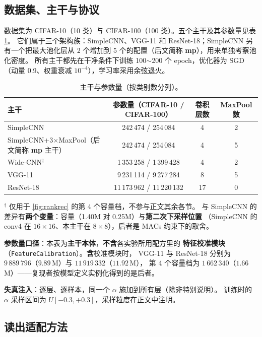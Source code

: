 \documentclass[11pt,a4paper]{ctexart}
\begin{document}
\subsection{数据集、主干与协议}

数据集为 CIFAR-10（10 类）与 CIFAR-100（100 类）。五个主干及其参数量见表 \ref{tab:arch}。
它们属于三个架构族：SimpleCNN、VGG-11 和 ResNet-18；SimpleCNN 另有一个把最大池化层从 2 个增加到 5 个的配置（后文简称 \textbf{mp}），用来单独考察池化密度。
所有主干都先在干净条件下训练 100$\sim$200 个 epoch，优化器为 SGD（动量 0.9、权重衰减 $10^{-4}$），学习率采用余弦退火。

\begin{table}[t]
\centering
\caption{主干与参数量（按类别数分列）。}
\label{tab:arch}
\small
\begin{tabular}{lccc}
\toprule
主干 & 参数量（CIFAR-10 / CIFAR-100） & 卷积层数 & MaxPool 数 \\
\midrule
SimpleCNN & 242\,474 / 254\,084 & 4 & 2 \\
SimpleCNN+3$\times$MaxPool（后文简称 \textbf{mp} 主干） & 242\,474 / 254\,084 & 4 & 5 \\
Wide-CNN$^\dagger$ & 1\,353\,258 / 1\,399\,428 & 4 & 2 \\
VGG-11 & 9\,231\,114 / 9\,277\,284 & 8 & 5 \\
ResNet-18 & 11\,173\,962 / 11\,220\,132 & 17 & 0 \\
\bottomrule
\end{tabular}

\vspace{2pt}
{\footnotesize $^\dagger$ 仅用于 \cref{fig:rankrec} 的第 4 个容量档，不参与正文其余各节。
与 SimpleCNN 的差异有\textbf{两个变量}：容量（1.40M 对 0.25M）与\textbf{第二次下采样位置}
（SimpleCNN 的 conv4 在 $16\times16$、本主干在 $8\times8$），后者是 MACs 约束下的取舍。\par
\textbf{参数量口径}：本表为\textbf{主干本体}，\textbf{不含}各实验所用配方里的
\textbf{特征校准模块}（\texttt{FeatureCalibration}）。\textbf{含}校准模块时，
VGG-11 与 ResNet-18 分别为 $9\,889\,796$（$9.89$\,M）与 $11\,919\,332$（$11.92$\,M），
第 4 个容量档为 $1\,662\,340$（$1.66$\,M）——复现者按模型定义实例化得到的是后者。}
\end{table}

\textbf{失真注入}：逐层、逐样本，同一个 $\alpha$ 施加到所有层（除非特别说明）。
训练时的 $\alpha$ 采样区间为 $U[-0.3,+0.3]$，采样粒度在正文中注明。

\subsection{读出适配方法}
\end{document}
